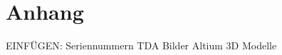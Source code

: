 \chapter{Anhang}
\label{sec:Anhang}
\pagestyle{scrheadings}
EINFÜGEN:
Seriennummern TDA
Bilder Altium
3D Modelle
